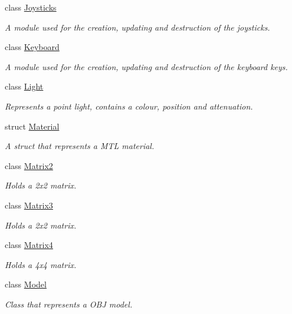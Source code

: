 \begin{DoxyCompactItemize}
class \hyperlink{class_flounder_1_1_joysticks}{Joysticks}
\begin{DoxyCompactList}\small\item\em A module used for the creation, updating and destruction of the joysticks. \end{DoxyCompactList}\item 
class \hyperlink{class_flounder_1_1_keyboard}{Keyboard}
\begin{DoxyCompactList}\small\item\em A module used for the creation, updating and destruction of the keyboard keys. \end{DoxyCompactList}\item 
class \hyperlink{class_flounder_1_1_light}{Light}
\begin{DoxyCompactList}\small\item\em Represents a point light, contains a colour, position and attenuation. \end{DoxyCompactList}\item 
struct \hyperlink{struct_flounder_1_1_material}{Material}
\begin{DoxyCompactList}\small\item\em A struct that represents a M\+TL material. \end{DoxyCompactList}\item 
class \hyperlink{class_flounder_1_1_matrix2}{Matrix2}
\begin{DoxyCompactList}\small\item\em Holds a 2x2 matrix. \end{DoxyCompactList}\item 
class \hyperlink{class_flounder_1_1_matrix3}{Matrix3}
\begin{DoxyCompactList}\small\item\em Holds a 2x2 matrix. \end{DoxyCompactList}\item 
class \hyperlink{class_flounder_1_1_matrix4}{Matrix4}
\begin{DoxyCompactList}\small\item\em Holds a 4x4 matrix. \end{DoxyCompactList}\item 
class \hyperlink{class_flounder_1_1_model}{Model}
\begin{DoxyCompactList}\small\item\em Class that represents a O\+BJ model. \end{DoxyCompactList}\item 

\end{DoxyCompactItemize}
